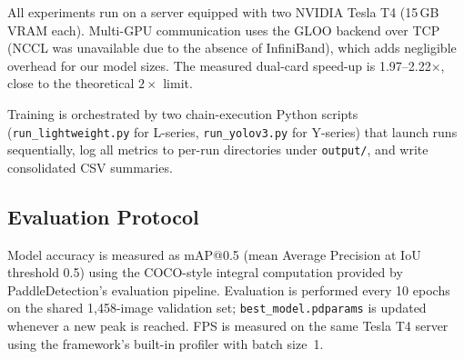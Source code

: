 All experiments run on a server equipped with two NVIDIA Tesla T4
(15\,GB VRAM each).  Multi-GPU communication uses the GLOO backend
over TCP (NCCL was unavailable due to the absence of InfiniBand),
which adds negligible overhead for our model sizes.
The measured dual-card speed-up is 1.97--2.22$\times$, close to the
theoretical $2\times$ limit.

Training is orchestrated by two chain-execution Python scripts
(\texttt{run\_lightweight.py} for L-series,
\texttt{run\_yolov3.py} for Y-series) that launch runs
sequentially, log all metrics to per-run directories under
\texttt{output/}, and write consolidated CSV summaries.

\subsection{Evaluation Protocol}

Model accuracy is measured as mAP@0.5 (mean Average Precision at
IoU threshold 0.5) using the COCO-style integral computation
provided by PaddleDetection's evaluation pipeline.
Evaluation is performed every 10 epochs on the shared 1,458-image
validation set; \texttt{best\_model.pdparams} is updated whenever
a new peak is reached.
FPS is measured on the same Tesla T4 server using the framework's
built-in profiler with batch size~1.
